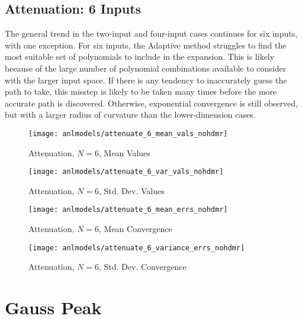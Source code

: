 \subsection{Attenuation: 6 Inputs}
The general trend in the two-input and four-input cases continues for six inputs, with one exception.  For six
inputs, the Adaptive method struggles to find the most suitable set of polynomials to include in the
expansion.  This is likely because of the large number of polynomial combinations available to consider 
with the larger input space.  If there is any tendency to inaccurately guess the path to take, this misstep is
likely to be taken many times before the more accurate path is discovered.  Otherwise, exponential convergence
is still observed, but with a larger radius of curvature than the lower-dimension cases.
\begin{figure}[H]
  \centering
  \texttt{[image: anlmodels/attenuate\_6\_mean\_vals\_nohdmr]}
  \caption{Attenuation, $N=6$, Mean Values}
  \label{fig:attenuate mean values 6}
\end{figure}
\begin{figure}[H]
  \centering
  \texttt{[image: anlmodels/attenuate\_6\_var\_vals\_nohdmr]}
  \caption{Attenuation, $N=6$, Std. Dev. Values}
  \label{fig:attenuate var values 6}
\end{figure}

\begin{figure}[H]
  \centering
  \texttt{[image: anlmodels/attenuate\_6\_mean\_errs\_nohdmr]}
  \caption{Attenuation, $N=6$, Mean Convergence}
  \label{fig:attenuate mean errors 6}
\end{figure}
\begin{figure}[H]
  \centering
  \texttt{[image: anlmodels/attenuate\_6\_variance\_errs\_nohdmr]}
  \caption{Attenuation, $N=6$, Std. Dev. Convergence}
  \label{fig:attenuate var errors 6}
\end{figure}


\section{Gauss Peak}
